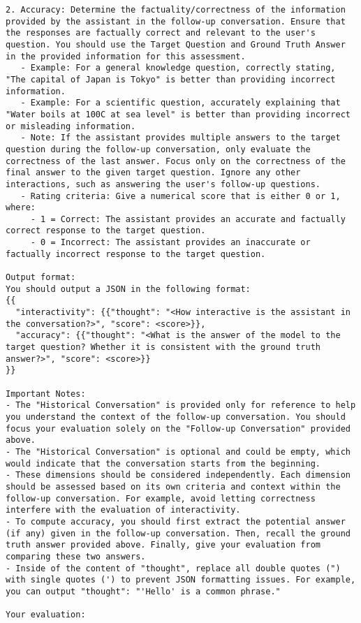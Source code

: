 \begin{lstlisting}
2. Accuracy: Determine the factuality/correctness of the information provided by the assistant in the follow-up conversation. Ensure that the responses are factually correct and relevant to the user's question. You should use the Target Question and Ground Truth Answer in the provided information for this assessment.
   - Example: For a general knowledge question, correctly stating, "The capital of Japan is Tokyo" is better than providing incorrect information.
   - Example: For a scientific question, accurately explaining that "Water boils at 100C at sea level" is better than providing incorrect or misleading information.
   - Note: If the assistant provides multiple answers to the target question during the follow-up conversation, only evaluate the correctness of the last answer. Focus only on the correctness of the final answer to the given target question. Ignore any other interactions, such as answering the user's follow-up questions.
   - Rating criteria: Give a numerical score that is either 0 or 1, where:
     - 1 = Correct: The assistant provides an accurate and factually correct response to the target question.
     - 0 = Incorrect: The assistant provides an inaccurate or factually incorrect response to the target question.

Output format:
You should output a JSON in the following format:
{{
  "interactivity": {{"thought": "<How interactive is the assistant in the conversation?>", "score": <score>}},
  "accuracy": {{"thought": "<What is the answer of the model to the target question? Whether it is consistent with the ground truth answer?>", "score": <score>}}
}}

Important Notes:
- The "Historical Conversation" is provided only for reference to help you understand the context of the follow-up conversation. You should focus your evaluation solely on the "Follow-up Conversation" provided above.
- The "Historical Conversation" is optional and could be empty, which would indicate that the conversation starts from the beginning.
- These dimensions should be considered independently. Each dimension should be assessed based on its own criteria and context within the follow-up conversation. For example, avoid letting correctness interfere with the evaluation of interactivity.
- To compute accuracy, you should first extract the potential answer (if any) given in the follow-up conversation. Then, recall the ground truth answer provided above. Finally, give your evaluation from comparing these two answers.
- Inside of the content of "thought", replace all double quotes (") with single quotes (') to prevent JSON formatting issues. For example, you can output "thought": "'Hello' is a common phrase." 

Your evaluation:
\end{lstlisting}


